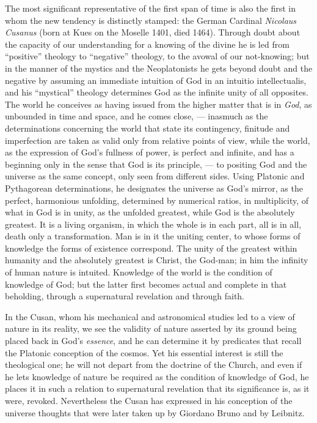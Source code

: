 The most significant representative of the first span of time is also
the first in whom the new tendency is distinctly stamped: the German
Cardinal \emph{Nicolaus Cusanus} (born at Kues on the Moselle 1401,
died 1464). Through doubt about the capacity of our understanding for
a knowing of the divine he is led from ``positive'' theology to
``negative'' theology, to the avowal of our not-knowing; but in the
manner of the mystics and the Neoplatonists he gets beyond doubt and
the negative by assuming an immediate intuition of God in an intuitio
intellectualis, and his ``mystical'' theology determines God as the
infinite unity of all opposites. The world he conceives as having
issued from the higher matter that is in \emph{God}, as unbounded in
time and space, and he comes close, --- inasmuch as the determinations
concerning the world that state its contingency, finitude and
imperfection are taken as valid only from relative points of view,
while the world, as the expression of God's fullness of power, is
perfect and infinite, and has a beginning only in the sense that God is
its principle, --- to positing God and the universe as the same
concept, only seen from different sides. Using Platonic and
Pythagorean determinations, he designates the universe as God's
mirror, as the perfect, harmonious unfolding, determined by numerical
ratios, in multiplicity, of what in God is in unity, as the unfolded
greatest, while God is the absolutely greatest. It is a living
organism, in which the whole is in each part, all is in all, death
only a transformation. Man is in it the uniting center, to whose forms
of knowledge the forms of existence correspond. The unity of the
greatest within humanity and the absolutely greatest is Christ, the
God-man; in him the infinity of human nature is intuited.
Knowledge of the world is the condition of knowledge of God; but the
latter first becomes actual and complete in that beholding, through a
supernatural revelation and through faith.

In the Cusan, whom his mechanical and astronomical studies led to a
view of nature in its reality, we see the validity of nature asserted
by its ground being placed back in God's \emph{essence}, and he can
determine it by predicates that recall the Platonic conception of the
cosmos. Yet his essential interest is still the theological one; he
will not depart from the doctrine of the Church, and even if he lets
knowledge of nature be required as the condition of knowledge of God,
he places it in such a relation to supernatural revelation that its
significance is, as it were, revoked. Nevertheless the Cusan has
expressed in his conception of the universe thoughts that were later
taken up by Giordano Bruno and by Leibnitz.

